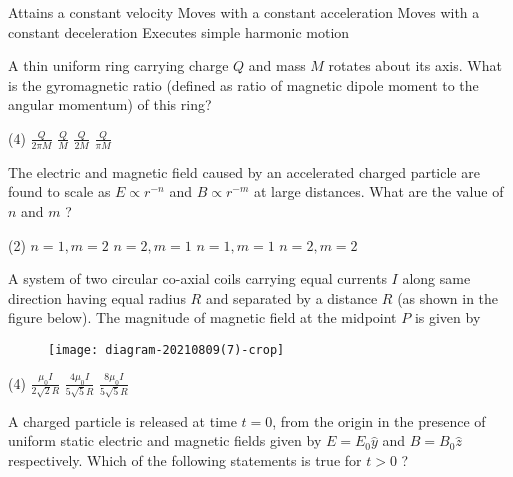 \begin{enumerate}
\begin{tasks}
	\task[\textbf{A.}] Attains a constant velocity
	\task[\textbf{B.}] Moves with a constant acceleration
	\task[\textbf{C.}] Moves with a constant deceleration
	\task[\textbf{D.}] Executes simple harmonic motion
\end{tasks}
\begin{minipage}{\textwidth}
	\item A thin uniform ring carrying charge $Q$ and mass $M$ rotates about its axis. What is the gyromagnetic ratio (defined as ratio of magnetic dipole moment to the angular momentum) of this ring?
\end{minipage}
\begin{tasks}(4)
	\task[\textbf{A.}] $\frac{Q}{2 \pi M}$
	\task[\textbf{B.}]$\frac{Q}{M}$
	\task[\textbf{C.}]$\frac{Q}{2 M}$
	\task[\textbf{D.}]$\frac{Q}{\pi M}$
\end{tasks}
\begin{minipage}{\textwidth}
	\item The electric and magnetic field caused by an accelerated charged particle are found to scale as $E \propto r^{-n}$ and $B \propto r^{-m}$ at large distances. What are the value of $n$ and $m$ ?
\end{minipage}
\begin{tasks}(2)
	\task[\textbf{A.}] $n=1, m=2$
	\task[\textbf{B.}] $n=2, m=1$
	\task[\textbf{C.}]$n=1, m=1$
	\task[\textbf{D.}]$n=2, m=2$
\end{tasks}
\begin{minipage}{\textwidth}
	\item A system of two circular co-axial coils carrying equal currents $I$ along same direction having equal radius $R$ and separated by a distance $R$ (as shown in the figure below). The magnitude of magnetic field at the midpoint $P$ is given by
	\begin{figure}[H]
		\centering
		\texttt{[image: diagram-20210809(7)-crop]}
		\caption{}
		\label{}
	\end{figure}
\end{minipage}
\begin{tasks}(4)
	\task[\textbf{A.}] $\frac{\mu_{0} I}{2 \sqrt{2} R}$
	\task[\textbf{B.}]$\frac{4 \mu_{0} I}{5 \sqrt{5} R}$
	\task[\textbf{C.}]$\frac{8 \mu_{0} I}{5 \sqrt{5} R}$
\end{tasks}
\begin{minipage}{\textwidth}
	\item A charged particle is released at time $t=0$, from the origin in the presence of uniform static electric and magnetic fields given by $E=E_{0} \hat{y}$ and $B=B_{0} \hat{z}$ respectively. Which of the following statements is true for $t>0$ ?

\end{minipage}
\end{enumerate}
